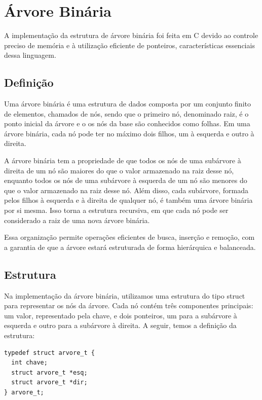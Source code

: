 \section{Árvore Binária}

A implementação da estrutura de árvore binária foi feita em C devido ao controle preciso de memória e à utilização eficiente de ponteiros, características essenciais dessa linguagem. 

\subsection{Definição}

Uma árvore binária é uma estrutura de dados composta por um conjunto finito de elementos, chamados de nós, sendo que o primeiro nó, denominado raiz, é o ponto inicial da árvore e o os nós da base são conhecidos como folhas. Em uma árvore binária, cada nó pode ter no máximo dois filhos, um à esquerda e outro à direita.

A árvore binária tem a propriedade de que todos os nós de uma subárvore à direita de um nó são maiores do que o valor armazenado na raiz desse nó, enquanto todos os nós de uma subárvore à esquerda de um nó são menores do que o valor armazenado na raiz desse nó. Além disso, cada subárvore, formada pelos filhos à esquerda e à direita de qualquer nó, é também uma árvore binária por si mesma. Isso torna a estrutura recursiva, em que cada nó pode ser considerado a raiz de uma nova árvore binária.

Essa organização permite operações eficientes de busca, inserção e remoção, com a garantia de que a árvore estará estruturada de forma hierárquica e balanceada.

\subsection{Estrutura}

Na implementação da árvore binária, utilizamos uma estrutura do tipo struct para representar os nós da árvore. Cada nó contém três componentes principais: um valor, representado pela chave, e dois ponteiros, um para a subárvore à esquerda e outro para a subárvore à direita. A seguir, temos a definição da estrutura:

\vspace{3mm}

\begin{lstlisting}
typedef struct arvore_t {
  int chave;
  struct arvore_t *esq;
  struct arvore_t *dir;
} arvore_t;
\end{lstlisting}


